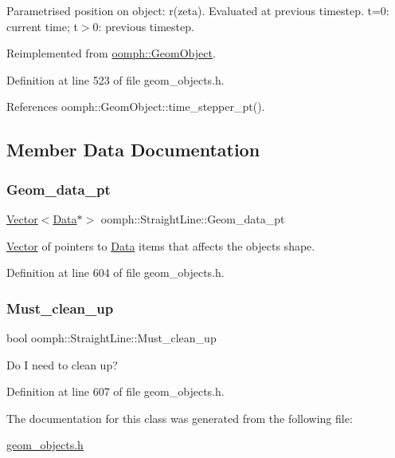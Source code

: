 Parametrised position on object\+: r(zeta). Evaluated at previous timestep. t=0\+: current time; t$>$0\+: previous timestep. 



Reimplemented from \hyperlink{classoomph_1_1GeomObject_ad44a736d23dcd63af163a7d80b5c4dfa}{oomph\+::\+Geom\+Object}.



Definition at line 523 of file geom\+\_\+objects.\+h.



References oomph\+::\+Geom\+Object\+::time\+\_\+stepper\+\_\+pt().



\subsection{Member Data Documentation}
\mbox{\label{classoomph_1_1StraightLine_a7a9fcb055a7c56ac9944bf100349be5c}} 
\subsubsection{\texorpdfstring{Geom\+\_\+data\+\_\+pt}{Geom\_data\_pt}}
{\footnotesize\ttfamily \hyperlink{classoomph_1_1Vector}{Vector}$<$\hyperlink{classoomph_1_1Data}{Data}$\ast$$>$ oomph\+::\+Straight\+Line\+::\+Geom\+\_\+data\+\_\+pt\hspace{0.3cm}{\ttfamily [private]}}



\hyperlink{classoomph_1_1Vector}{Vector} of pointers to \hyperlink{classoomph_1_1Data}{Data} items that affects the object\textquotesingle{}s shape. 



Definition at line 604 of file geom\+\_\+objects.\+h.

\mbox{\label{classoomph_1_1StraightLine_a945d35820dd54e51d2e7aa1086fe686f}} 
\subsubsection{\texorpdfstring{Must\+\_\+clean\+\_\+up}{Must\_clean\_up}}
{\footnotesize\ttfamily bool oomph\+::\+Straight\+Line\+::\+Must\+\_\+clean\+\_\+up\hspace{0.3cm}{\ttfamily [private]}}



Do I need to clean up? 



Definition at line 607 of file geom\+\_\+objects.\+h.



The documentation for this class was generated from the following file\+:\begin{DoxyCompactItemize}
\item 
\hyperlink{geom__objects_8h}{geom\+\_\+objects.\+h}\end{DoxyCompactItemize}
